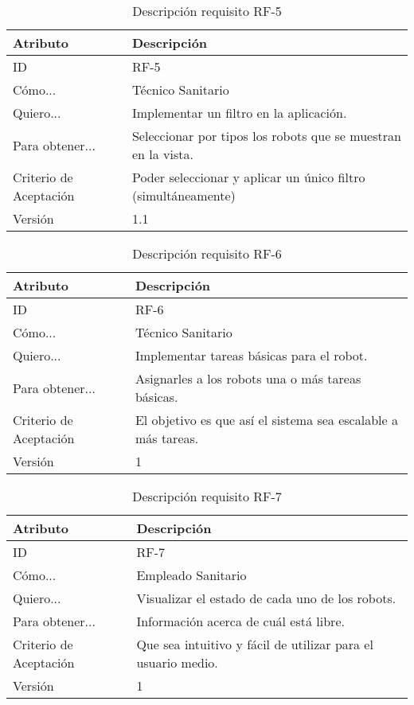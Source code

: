 \begin{table}[H]
    \label{tab:reqF5}
 	\caption{Descripción requisito RF-5}
	\centering
	
	\begin{tabular}{C{3cm}|C{12cm}}
 		\toprule
 		\textbf{Atributo} & \textbf{Descripción} \\
 		\midrule
 	    ID & RF-5 \\
 	    Cómo... &  Técnico Sanitario\\
 	    Quiero... &  Implementar un filtro en la aplicación. \\
 	    Para obtener... &  Seleccionar por tipos los robots que se muestran en la vista. \\
 	    Criterio de Aceptación &  Poder seleccionar y aplicar un único filtro (simultáneamente)\\
 	    Versión & 1.1 \\
 		\bottomrule
 		\end{tabular}
\end{table}



\begin{table}[H]
    \label{tab:reqF6}
 	\caption{Descripción requisito RF-6}
	\centering
	
	\begin{tabular}{C{3cm}|C{12cm}}
 		\toprule
 		\textbf{Atributo} & \textbf{Descripción} \\
 		\midrule
 	    ID & RF-6 \\
 	    Cómo... & Técnico Sanitario \\
 	    Quiero... & Implementar tareas básicas para el robot. \\
 	    Para obtener... & Asignarles a los robots una o más tareas básicas.  \\
 	    Criterio de Aceptación & El objetivo es que así el sistema sea escalable a más tareas. \\
 	    Versión & 1 \\
 		\bottomrule
 		\end{tabular}
\end{table}

\begin{table}[H]
    \label{tab:reqF7}
 	\caption{Descripción requisito RF-7}
	\centering
	
	\begin{tabular}{C{3cm}|C{12cm}}
 		\toprule
 		\textbf{Atributo} & \textbf{Descripción} \\
 		\midrule
 	    ID & RF-7 \\
 	    Cómo... & Empleado Sanitario \\
 	    Quiero... & Visualizar el estado de cada uno de los robots. \\
 	    Para obtener... & Información acerca de cuál está libre.  \\
 	    Criterio de Aceptación & Que sea intuitivo y fácil de utilizar para el usuario medio. \\
 	    Versión & 1 \\
 		\bottomrule
 		\end{tabular}
\end{table}


